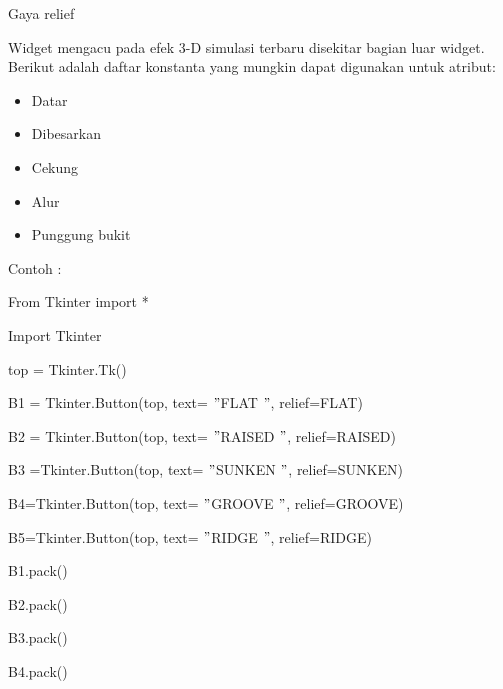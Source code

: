 \documentclass{wileySix}
\begin{document}
\begin{myEnumerate}
\begin{myEnumerate}
{\begin{myEnumerate}
	\noindent 
	\item Gaya relief \par
	\noindent 
	Widget mengacu pada efek 3-D simulasi terbaru disekitar bagian luar widget. Berikut adalah daftar konstanta yang mungkin dapat digunakan untuk atribut: \par
	\noindent 
	\begin{itemize}
		\item Datar \par
		\noindent 
		\item Dibesarkan \par
		\noindent 
		\item Cekung \par
		\noindent 
		\item Alur \par
		\noindent 
		\item Punggung bukit\end{itemize}
	\par
	\vspace{12pt}
	Contoh : \par
	{\fontsize{10pt}{10pt}\selectfont From Tkinter import *} \par
	{\fontsize{10pt}{10pt}\selectfont Import Tkinter} \par
	\vspace{10pt}
	{\fontsize{10pt}{10pt}\selectfont top = Tkinter.Tk()} \par
	{\fontsize{10pt}{10pt}\selectfont B1 = Tkinter.Button(top, text= $ " $FLAT $ " $, relief=FLAT)} \par
	{\fontsize{10pt}{10pt}\selectfont B2 = Tkinter.Button(top, text= $ " $RAISED $ " $, relief=RAISED)} \par
	{\fontsize{10pt}{10pt}\selectfont B3 =Tkinter.Button(top, text= $ " $SUNKEN $ " $, relief=SUNKEN)} \par
	{\fontsize{10pt}{10pt}\selectfont B4=Tkinter.Button(top, text= $ " $GROOVE $ " $, relief=GROOVE)} \par
	{\fontsize{10pt}{10pt}\selectfont B5=Tkinter.Button(top, text= $ " $RIDGE $ " $, relief=RIDGE)} \par
	\vspace{10pt}
	{\fontsize{10pt}{10pt}\selectfont B1.pack()} \par
	{\fontsize{10pt}{10pt}\selectfont B2.pack()} \par
	{\fontsize{10pt}{10pt}\selectfont B3.pack()} \par
	{\fontsize{10pt}{10pt}\selectfont B4.pack()} \par

\end{myEnumerate}}
\end{myEnumerate}
\end{myEnumerate}
\end{document}
